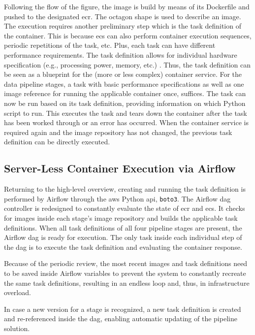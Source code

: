 Following the flow of the figure, the image is build by means of its Dockerfile and pushed to the designated \ac{ecr}. The octagon shape is used to describe an image. The execution requires another preliminary step which is the task definition of the container. This is because \ac{ecs} can also perform container execution sequences, periodic repetitions of the task, etc. Plus, each task can have different performance requirements. The task definition allows for individual hardware specification (e.g., processing power, memory, etc.) \cite{ecs}. Thus, the task definition can be seen as a blueprint for the (more or less complex) container service. For the data pipeline stages, a task with basic performance specifications as well as one image reference for running the applicable container once, suffices. The task can now be run based on its task definition, providing information on which Python script to run. This executes the task and tears down the container after the task has been worked through or an error has occurred. When the container service is required again and the image repository has not changed, the previous task definition can be directly executed.

\subsection{Server-Less Container Execution via Airflow}
Returning to the high-level overview, creating and running the task definition is performed by Airflow through the \ac{aws} Python \acs{api}, \texttt{boto3}. The Airflow \ac{dag} controller is redesigned to constantly evaluate the state of \ac{ecr} and \ac{ecs}. It checks for images inside each stage's image repository and builds the applicable task definitions. When all task definitions of all four pipeline stages are present, the Airflow \ac{dag} is ready for execution. The only task inside each individual step of the \ac{dag} is to execute the task definition and evaluating the container response.

Because of the periodic review, the most recent images and task definitions need to be saved inside Airflow variables to prevent the system to constantly recreate the same task definitions, resulting in an endless loop and, thus, in infrastructure overload.

In case a new version for a stage is recognized, a new task definition is created and re-referenced inside the \ac{dag}, enabling automatic updating of the pipeline solution.

